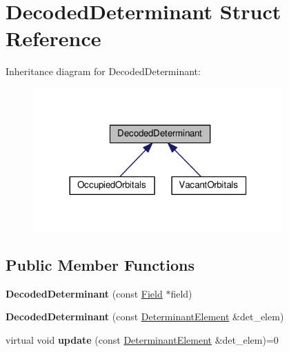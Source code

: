 \hypertarget{structDecodedDeterminant}{}\section{Decoded\+Determinant Struct Reference}
\label{structDecodedDeterminant}


Inheritance diagram for Decoded\+Determinant\+:
\nopagebreak
\begin{figure}[H]
\begin{center}
\leavevmode
\includegraphics[width=272pt]{structDecodedDeterminant__inherit__graph}
\end{center}
\end{figure}
\subsection*{Public Member Functions}
\begin{DoxyCompactItemize}
\item 
{\bfseries Decoded\+Determinant} (const \hyperlink{classField}{Field} $\ast$field)\hypertarget{structDecodedDeterminant_a0735455c5d917595573d4710dd8fe61a}{}\label{structDecodedDeterminant_a0735455c5d917595573d4710dd8fe61a}

\item 
{\bfseries Decoded\+Determinant} (const \hyperlink{classDeterminantElement}{Determinant\+Element} \&det\+\_\+elem)\hypertarget{structDecodedDeterminant_a694c656a8d47a8637fff4bd23f3bc543}{}\label{structDecodedDeterminant_a694c656a8d47a8637fff4bd23f3bc543}

\item 
virtual void {\bfseries update} (const \hyperlink{classDeterminantElement}{Determinant\+Element} \&det\+\_\+elem)=0\hypertarget{structDecodedDeterminant_a9d957e501d01a230a41521595377f66d}{}\label{structDecodedDeterminant_a9d957e501d01a230a41521595377f66d}

\end{DoxyCompactItemize}

